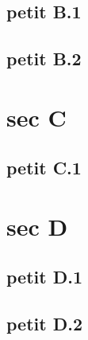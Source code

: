 \documentclass{backend/backend}
\begin{document}
\subsection{petit B.1}
\subsection{petit B.2}

\section{sec C}
\subsection{petit C.1}
\section{sec D}
\subsection{petit D.1}
\subsection{petit D.2}
\end{document}
